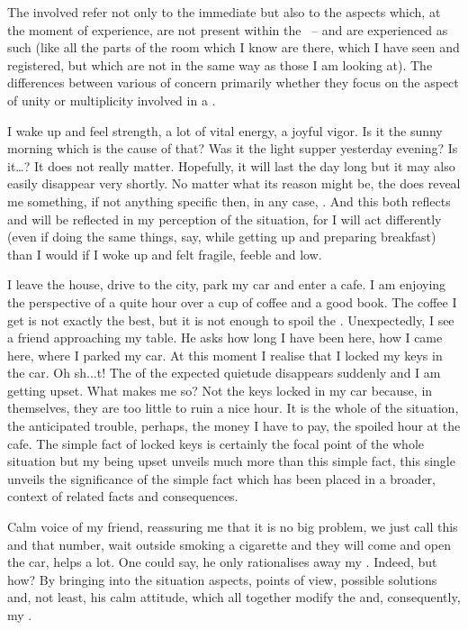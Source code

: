 \label{impressConcept}

\pa The involved  refer not only to the immediate
 but also to the {aspects} which, at the moment of experience, are
not present within the \hoa\ -- and are experienced as such (like all the parts
of the room which I know are there, which I have seen and registered, but which
are not  in the same way as those I am  looking at). The
differences between various  of  concern primarily
whether they focus on the aspect of unity or multiplicity involved in a
.

%
I wake up and feel strength, a lot of vital energy, a joyful 
vigor. Is it the sunny morning which is the cause of that? Was it the 
light supper yesterday evening? Is it\ldots? It does not really matter. 
Hopefully, it will last the day long but it may also 
easily disappear very shortly. No matter what its reason might be, the 
 does reveal me something, if not anything specific then, 
in any case, . And this both reflects and will be 
reflected in my perception of the situation, for I will act 
differently (even if doing the same things, say, while getting up and preparing
breakfast) than I would if I woke up and felt fragile, feeble and low.

I leave the house, drive to the city, park my car and enter a cafe.  I am
enjoying the perspective of a quite hour over a cup of coffee and a good book.
The coffee I get is not exactly the best, but it is not enough to spoil the
.  Unexpectedly, I see a friend approaching my table. He asks how long
I have been here, how I came here, where I parked my car. At this moment I
realise that I locked my keys in the car. Oh sh...t! The  of the
expected quietude disappears suddenly and I am getting upset. What makes me so?
Not the keys locked in my car because, in themselves, they are too little to
ruin a nice hour. It is the whole  of the situation, the anticipated
trouble, perhaps, the money I have to pay, the spoiled hour at the cafe. The
simple fact of locked keys is certainly the focal point of the whole situation
but my being upset unveils much more than this simple fact, this single
 unveils the significance of the simple fact which has been
placed in a broader,  context of related facts and consequences.

Calm voice of my friend, reassuring me that it is no big problem, we just call
this and that number, wait outside smoking a cigarette and they will come and
open the car, helps a lot. One could say, he only rationalises away my
.  Indeed, but how? By bringing into the situation aspects,
points of view, possible solutions and, not least, his calm attitude, which all
together modify the  and, consequently, my .

